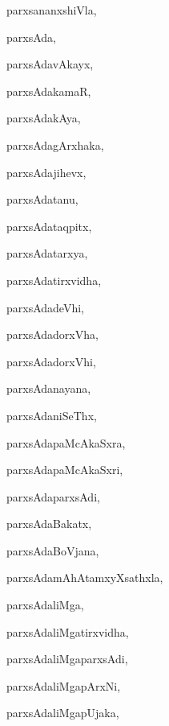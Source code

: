 \begin{multicols}{3}
{\noindent
{parxsananxshiVla}, \pageref{parxsananxshiVla}

\noindent
{parxsAda}, \pageref{parxsAda}

\noindent
{parxsAdavAkayx}, \pageref{parxsAdavAkayx}

\noindent
{parxsAdakamaR}, \pageref{parxsAdakamaR}

\noindent
{parxsAdakAya}, \pageref{parxsAdakAya}

\noindent
{parxsAdagArxhaka}, \pageref{parxsAdagArxhaka}

\noindent
{parxsAdajihevx}, \pageref{parxsAdajihevx}

\noindent
{parxsAdatanu}, \pageref{parxsAdatanu}

\noindent
{parxsAdataqpitx}, \pageref{parxsAdataqpitx}

\noindent
{parxsAdatarxya}, \pageref{parxsAdatarxya}

\noindent
{parxsAdatirxvidha}, \pageref{parxsAdatirxvidha}

\noindent
{parxsAdadeVhi}, \pageref{parxsAdadeVhi}

\noindent
{parxsAdadorxVha}, \pageref{parxsAdadorxVha}

\noindent
{parxsAdadorxVhi}, \pageref{parxsAdadorxVhi}

\noindent
{parxsAdanayana}, \pageref{parxsAdanayana}

\noindent
{parxsAdaniSeThx}, \pageref{parxsAdaniSeThx}

\noindent
{parxsAdapaMcAkaSxra}, \pageref{parxsAdapaMcAkaSxra}

\noindent
{parxsAdapaMcAkaSxri}, \pageref{parxsAdapaMcAkaSxri}

\noindent
{parxsAdaparxsAdi}, \pageref{parxsAdaparxsAdi}

\noindent
{parxsAdaBakatx}, \pageref{parxsAdaBakatx}

\noindent
{parxsAdaBoVjana}, \pageref{parxsAdaBoVjana}

\noindent
{parxsAdamAhAtamxyXsathxla}, \pageref{parxsAdamAhAtamxyXsathxla}

\noindent
{parxsAdaliMga}, \pageref{parxsAdaliMga}

\noindent
{parxsAdaliMgatirxvidha}, \pageref{parxsAdaliMgatirxvidha}

\noindent
{parxsAdaliMgaparxsAdi}, \pageref{parxsAdaliMgaparxsAdi}

\noindent
{parxsAdaliMgapArxNi}, \pageref{parxsAdaliMgapArxNi}

\noindent
{parxsAdaliMgapUjaka}, \pageref{parxsAdaliMgapUjaka}

}
\end{multicols}
